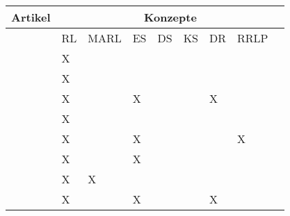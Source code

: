 \begin{longtable}{|l|llllllll|}
    \hline
    \multicolumn{1}{|c|}{Artikel} & \multicolumn{8}{c|}{Konzepte}                                                                                                                                                                \\ \hline
    \endhead
                                  & \multicolumn{1}{l|}{RL} & \multicolumn{1}{l|}{MARL} & \multicolumn{1}{l|}{ES} & \multicolumn{1}{l|}{DS} & \multicolumn{1}{l|}{KS} & \multicolumn{1}{l|}{DR} & \multicolumn{1}{l|}{RRLP}  \\ \hline
    \cite[]{Sutton.2018}          & \multicolumn{1}{l|}{X}   & \multicolumn{1}{l|}{}     & \multicolumn{1}{l|}{}   & \multicolumn{1}{l|}{}   & \multicolumn{1}{l|}{}   & \multicolumn{1}{l|}{}   & \multicolumn{1}{l|}{}      \\ \hline
    \cite[]{Li.2019}              & \multicolumn{1}{l|}{X}   & \multicolumn{1}{l|}{}     & \multicolumn{1}{l|}{}   & \multicolumn{1}{l|}{}   & \multicolumn{1}{l|}{}   & \multicolumn{1}{l|}{}   & \multicolumn{1}{l|}{}      \\ \hline
    \cite[]{Zhao.2020}            & \multicolumn{1}{l|}{X}   & \multicolumn{1}{l|}{}     & \multicolumn{1}{l|}{X}   & \multicolumn{1}{l|}{}   & \multicolumn{1}{l|}{}   & \multicolumn{1}{l|}{X}   & \multicolumn{1}{l|}{}      \\ \hline
    \cite[]{Wang.2020}            & \multicolumn{1}{l|}{X}   & \multicolumn{1}{l|}{}     & \multicolumn{1}{l|}{}   & \multicolumn{1}{l|}{}   & \multicolumn{1}{l|}{}   & \multicolumn{1}{l|}{}   & \multicolumn{1}{l|}{}      \\ \hline
    \cite[]{Zhang.2018}           & \multicolumn{1}{l|}{X}   & \multicolumn{1}{l|}{}     & \multicolumn{1}{l|}{X}   & \multicolumn{1}{l|}{}   & \multicolumn{1}{l|}{}   & \multicolumn{1}{l|}{}   & \multicolumn{1}{l|}{X}      \\ \hline
    \cite[]{Cutler.2014}          & \multicolumn{1}{l|}{X}   & \multicolumn{1}{l|}{}     & \multicolumn{1}{l|}{X}   & \multicolumn{1}{l|}{}   & \multicolumn{1}{l|}{}   & \multicolumn{1}{l|}{}   & \multicolumn{1}{l|}{}      \\ \hline
    \cite[]{Canese.2021}          & \multicolumn{1}{l|}{X}   & \multicolumn{1}{l|}{X}    & \multicolumn{1}{l|}{}   & \multicolumn{1}{l|}{}   & \multicolumn{1}{l|}{}   & \multicolumn{1}{l|}{}   & \multicolumn{1}{l|}{}      \\ \hline
    \cite[]{Reda.2020}            & \multicolumn{1}{l|}{X}   & \multicolumn{1}{l|}{}     & \multicolumn{1}{l|}{X}   & \multicolumn{1}{l|}{}   & \multicolumn{1}{l|}{}   & \multicolumn{1}{l|}{X}   & \multicolumn{1}{l|}{}      \\ \hline

\end{longtable}
